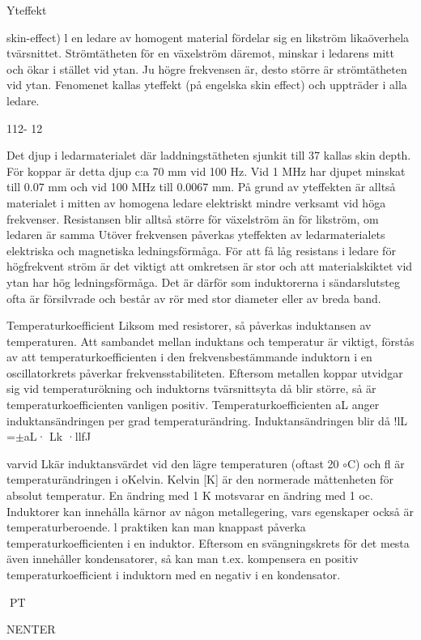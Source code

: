 Yteffekt {skin-effect)
l en ledare av homogent material fördelar sig
en likström likaöverhela tvärsnittet. Strömtätheten för en växelström däremot, minskar i
ledarens mitt och ökar i stället vid ytan. Ju
högre frekvensen är, desto större är strömtätheten vid ytan. Fenomenet kallas yteffekt
(på engelska skin effect) och uppträder i alla
ledare.

112- 12

Det djup i ledarmaterialet där laddningstätheten sjunkit till 37%
kallas skin depth. För koppar är detta djup
c:a 70 mm vid 100 Hz. Vid 1 MHz har djupet
minskat till 0.07 mm och vid 100 MHz till
0.0067 mm. På grund av yteffekten är alltså
materialet i mitten av homogena ledare elektriskt mindre verksamt vid höga frekvenser.
Resistansen blir alltså större för växelström
än för likström, om ledaren är samma
Utöver frekvensen påverkas yteffekten
av ledarmaterialets elektriska och magnetiska ledningsförmåga. För att få låg resistans
i ledare för högfrekvent ström är det viktigt att
omkretsen är stor och att materialskiktet vid
ytan har hög ledningsförmåga. Det är därför
som induktorerna i sändarslutsteg ofta är
försilvrade och består av rör med stor diameter eller av breda band.

Temperaturkoefficient
Liksom med resistorer, så påverkas induktansen av temperaturen. Att sambandet
mellan induktans och temperatur är viktigt,
förstås av att temperaturkoefficienten i den
frekvensbestämmande induktorn i en oscillatorkrets påverkar frekvensstabiliteten.
Eftersom metallen koppar utvidgar sig
vid temperaturökning och induktorns tvärsnittsyta då blir större, så är temperaturkoefficienten vanligen positiv.
Temperaturkoefficienten aL anger induktansändringen per grad temperaturändring.
Induktansändringen blir då
!lL =\(\pm\)aL· Lk ·llfJ

varvid Lkär induktansvärdet vid den lägre
temperaturen (oftast 20 \(\circ\)C) och fl{} är
temperaturändringen i oKelvin.
Kelvin [K] är den normerade måttenheten
för absolut temperatur. En ändring med 1 K
motsvarar en ändring med 1 oc.
Induktorer kan innehålla kärnor av någon
metallegering, vars egenskaper också är
temperaturberoende.
l praktiken kan man knappast påverka
temperaturkoefficienten i en induktor. Eftersom en svängningskrets för det mesta även
innehåller kondensatorer, så kan man t.ex.
kompensera en positiv temperaturkoefficient
i induktorn med en negativ i en kondensator.

PT

NENTER

}
